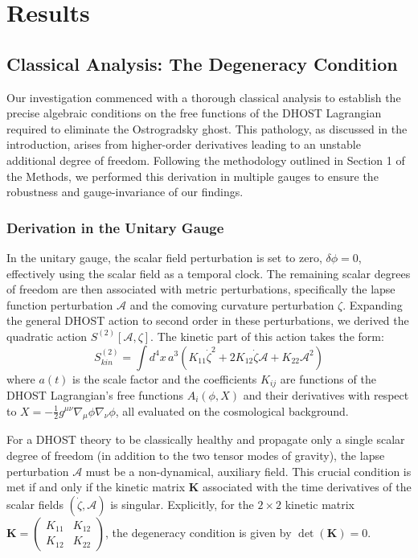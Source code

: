 \documentclass[twocolumn]{aastex631}
\begin{document}
\section{Results}
\label{sec:results}
\subsection{Classical Analysis: The Degeneracy Condition}

Our investigation commenced with a thorough classical analysis to establish the precise algebraic conditions on the free functions of the DHOST Lagrangian required to eliminate the Ostrogradsky ghost. This pathology, as discussed in the introduction, arises from higher-order derivatives leading to an unstable additional degree of freedom. Following the methodology outlined in Section 1 of the Methods, we performed this derivation in multiple gauges to ensure the robustness and gauge-invariance of our findings.

\subsubsection{Derivation in the Unitary Gauge}
In the unitary gauge, the scalar field perturbation is set to zero, $\delta\phi=0$, effectively using the scalar field as a temporal clock. The remaining scalar degrees of freedom are then associated with metric perturbations, specifically the lapse function perturbation $\mathcal{A}$ and the comoving curvature perturbation $\zeta$. Expanding the general DHOST action to second order in these perturbations, we derived the quadratic action $S^{(2)}[\mathcal{A}, \zeta]$. The kinetic part of this action takes the form:
\begin{equation}
S^{(2)}_{kin} = \int d^4x \, a^3 \left( K_{11} \dot{\zeta}^2 + 2 K_{12} \dot{\zeta} \mathcal{A} + K_{22} \mathcal{A}^2 \right)
\end{equation}
where $a(t)$ is the scale factor and the coefficients $K_{ij}$ are functions of the DHOST Lagrangian's free functions $A_i(\phi, X)$ and their derivatives with respect to $X = -\frac{1}{2} g^{\mu\nu} \nabla_\mu\phi \nabla_\nu\phi$, all evaluated on the cosmological background.

For a DHOST theory to be classically healthy and propagate only a single scalar degree of freedom (in addition to the two tensor modes of gravity), the lapse perturbation $\mathcal{A}$ must be a non-dynamical, auxiliary field. This crucial condition is met if and only if the kinetic matrix $\mathbf{K}$ associated with the time derivatives of the scalar fields $(\dot{\zeta}, \mathcal{A})$ is singular. Explicitly, for the $2 \times 2$ kinetic matrix $\mathbf{K} = \begin{pmatrix} K_{11} & K_{12} \\ K_{12} & K_{22} \end{pmatrix}$, the degeneracy condition is given by $\det(\mathbf{K}) = 0$.
\end{document}
